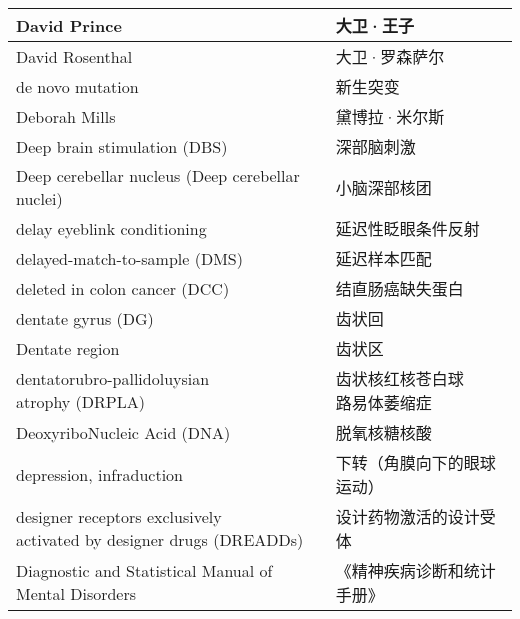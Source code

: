 \begin{longtable}{lll}
	\midrule
	David Prince     &&  大卫·王子  \\
	
	\midrule
	David Rosenthal     &&  大卫·罗森萨尔  \\
	
	\midrule
	de novo mutation     &&  新生突变  \\
	
	\midrule
	Deborah Mills     &&  黛博拉·米尔斯  \\
	
	\midrule
	Deep brain stimulation (DBS)     &&  深部脑刺激  \\
	
	\midrule
	Deep cerebellar nucleus  (Deep 	cerebellar nuclei)   &&  小脑深部核团  \\
	
	\midrule
	delay eyeblink conditioning   &&  延迟性眨眼条件反射  \\
	
	\midrule
	delayed-match-to-sample  (DMS)   &&  延迟样本匹配  \\
	
	\midrule
	deleted in colon cancer (DCC)     &&  结直肠癌缺失蛋白  \\
	
	\midrule
	dentate gyrus (DG)     && 齿状回 \\
	
	\midrule
	Dentate region     && 齿状区 \\
	
	\midrule
	\makecell{dentatorubro-pallidoluysian\\ atrophy (DRPLA)}     &&  \makecell{齿状核红核苍白球\\路易体萎缩症}  \\
	
	\midrule
	DeoxyriboNucleic Acid (DNA)     &&  脱氧核糖核酸  \\
	
	\midrule
	depression, infraduction     &&  下转（角膜向下的眼球运动）  \\
	
	\midrule
	\makecell{designer receptors exclusively\\ activated by designer drugs (DREADDs)}    &&  设计药物激活的设计受体  \\
	
	\midrule
	\makecell{Diagnostic and Statistical Manual of \\Mental Disorders}     &&  《精神疾病诊断和统计手册》  \\
	

\end{longtable}
